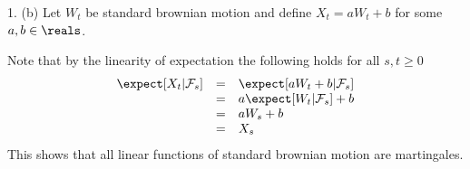 \documentclass[11pt,a4paper]{article}
\begin{document}
\begin{answer}{1. (b)}
  Let $W_t$ be standard brownian motion and define $X_t=aW_t+b$ for some $a,b\in\reals$.
  \par Note that by the linearity of expectation the following holds for all $s,t\geq0$
  \[\begin{array}{rcl}
    \expect[X_t|\mathcal{F}_s]&=&\expect[aW_t+b|\mathcal{F}_s]\\
    &=&a\expect[W_t|\mathcal{F}_s]+b\\
    &=&aW_s+b\\
    &=&X_s
  \end{array}\]
  This shows that all linear functions of standard brownian motion are martingales.
\end{answer}
\end{document}
